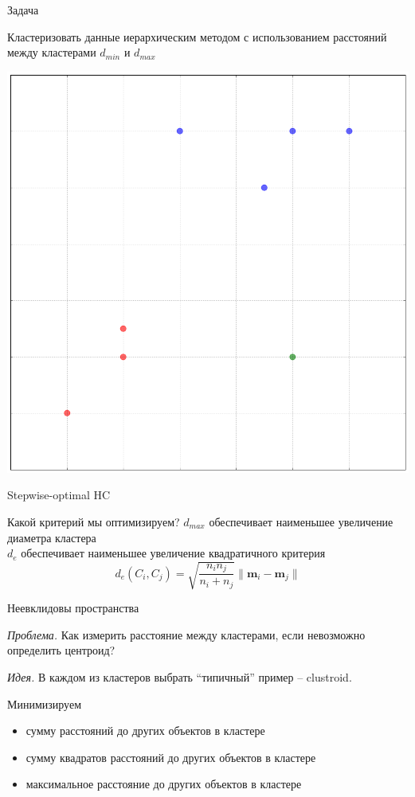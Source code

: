 \documentclass[aspectratio=169]{beamer}
\begin{document}
\begin{frame}{Задача}

Кластеризовать данные иерархическим методом с использованием расстояний между кластерами $d_{min}$ и $d_{max}$
\begin{center}
\includegraphics[height=0.7\textheight]{images/toy.png}
\end{center}

\end{frame}

\begin{frame}{Stepwise-optimal HC}

Какой критерий мы оптимизируем?
\swo
$d_{max}$ обеспечивает наименьшее увеличение диаметра кластера \\
$d_e$ обеспечивает наименьшее увеличение квадратичного критерия
\[
d_e(C_i, C_j) = \sqrt{\frac{n_i n_j}{n_i + n_j}} \|\mathbf{m}_i -\mathbf{m}_j \|
\]

\end{frame}

\begin{frame}{Неевклидовы пространства}

{\it Проблема. } Как измерить расстояние между кластерами, если невозможно определить центроид?

\vspace{1em}
{\it Идея. } В каждом из кластеров выбрать ``типичный'' пример -- clustroid.

\vspace{1em}
Минимизируем
\begin{itemize}
\item сумму расстояний до других объектов в кластере
\item сумму квадратов расстояний до других объектов в кластере
\item максимальное расстояние до других объектов в кластере
\end{itemize}

\end{frame}
\end{document}
